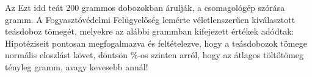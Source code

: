 Az Ezt idd teát 200 grammos dobozokban árulják, a csomagológép szórása 
 gramm. A Fogyasztóvédelmi Felügyelőség lemérte  
véletlenszerűen kiválasztott teásdoboz tömegét, melyekre az alábbi 
grammban kifejezett értékek adódtak:
Hipotéziseit pontosan megfogalmazva és feltételezve, hogy a teásdobozok 
tömege normális eloszlást követ, döntsön \%-os szinten arról, 
hogy az átlagos töltőtömeg tényleg  gramm, avagy kevesebb annál!